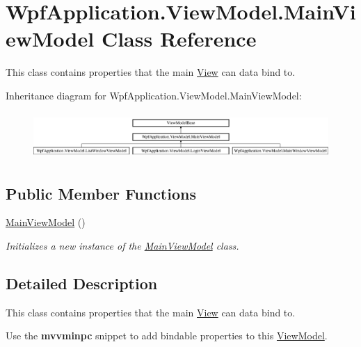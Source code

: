 \hypertarget{class_wpf_application_1_1_view_model_1_1_main_view_model}{\section{Wpf\-Application.\-View\-Model.\-Main\-View\-Model Class Reference}
\label{class_wpf_application_1_1_view_model_1_1_main_view_model}
}


This class contains properties that the main \hyperlink{namespace_wpf_application_1_1_view}{View} can data bind to.  


Inheritance diagram for Wpf\-Application.\-View\-Model.\-Main\-View\-Model\-:\begin{figure}[H]
\begin{center}
\leavevmode
\includegraphics[height=1.800643cm]{class_wpf_application_1_1_view_model_1_1_main_view_model}
\end{center}
\end{figure}
\subsection*{Public Member Functions}
\begin{DoxyCompactItemize}
\item 
\hyperlink{class_wpf_application_1_1_view_model_1_1_main_view_model_a10d48f1102c37721d158217627222e4b}{Main\-View\-Model} ()
\begin{DoxyCompactList}\small\item\em Initializes a new instance of the \hyperlink{class_wpf_application_1_1_view_model_1_1_main_view_model}{Main\-View\-Model} class. \end{DoxyCompactList}\end{DoxyCompactItemize}


\subsection{Detailed Description}
This class contains properties that the main \hyperlink{namespace_wpf_application_1_1_view}{View} can data bind to. 

Use the {\bfseries mvvminpc} snippet to add bindable properties to this \hyperlink{namespace_wpf_application_1_1_view_model}{View\-Model}. 

